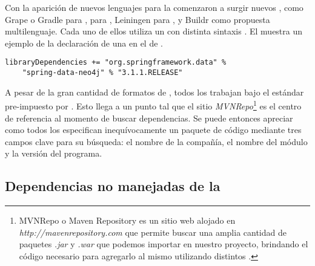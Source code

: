 Con la aparición de nuevos lenguajes para la \jvm comenzaron a surgir nuevos
\depmgrs, como Grape o Gradle para \groovy, \sbt para \scala, Leiningen para 
\clojure, y \apache Buildr como propuesta multilenguaje. Cada uno de ellos 
utiliza un \conffile con distinta sintaxis
. El 
 muestra un ejemplo de la declaración 
de una \dependency en el \conffile de \sbt.\\

\begin{listing}[htb]
\begin{verbatim}
libraryDependencies += "org.springframework.data" %
    "spring-data-neo4j" % "3.1.1.RELEASE"
\end{verbatim}
\caption{Dependencia de SpringFramework 3.1.1 para \sbt}
\label{code:depmgmnt:jvm:sbt_module_add}
\end{listing}

A pesar de la gran cantidad de formatos de \conffile, todos los \depmgrs
trabajan bajo el estándar pre-impuesto por \maven. Esto llega a un punto tal 
que el sitio \emph{MVNRepo}\footnote{
	MVNRepo o Maven Repository es un sitio web alojado en 
	\emph{http://mavenrepository.com} que permite buscar una amplia cantidad de 
	paquetes \emph{.jar} y \emph{.war}	que podemos importar en nuestro 
	proyecto, brindando el código necesario para agregarlo al mismo utilizando 
	distintos \depmgrs.
} es el centro de referencia al momento de buscar 
dependencias. Se puede entonces apreciar como todos los \conffiles especifican
inequívocamente un paquete de código mediante tres campos clave para su 
búsqueda: el nombre de la compañía, el nombre del módulo y la versión del 
programa.\\

\subsection{Dependencias no manejadas de la \viewtier}
\label{subsec:depmgmnt:jvm_dev:view_dependencies}


